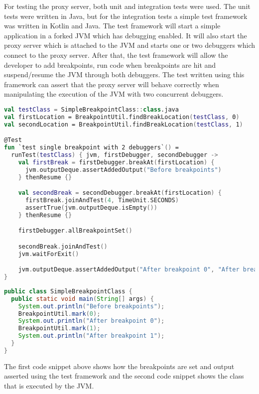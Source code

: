 \documentclass[..thesis.tex]{subfiles}
\begin{document}
For testing the proxy server, both unit and integration tests were used.
The unit tests were written in Java, but for the integration tests a simple test framework was written in Kotlin and Java.
The test framework will start a simple application in a forked JVM which has debugging enabled.
It will also start the proxy server which is attached to the JVM and starts one or two debuggers which connect to the proxy server.
After that, the test framework will allow the developer to add breakpoints, run code when breakpoints are hit and suspend/resume the JVM through both debuggers.
The test written using this framework can assert that the proxy server will behave correctly when manipulating the execution of the JVM with two concurrent debuggers.

\begin{lstlisting}[language=Kotlin]
val testClass = SimpleBreakpointClass::class.java
val firstLocation = BreakpointUtil.findBreakLocation(testClass, 0)
val secondLocation = BreakpointUtil.findBreakLocation(testClass, 1)

@Test
fun `test single breakpoint with 2 debuggers`() = 
  runTest(testClass) { jvm, firstDebugger, secondDebugger ->
    val firstBreak = firstDebugger.breakAt(firstLocation) {
      jvm.outputDeque.assertAddedOutput("Before breakpoints")
    } thenResume {}

    val secondBreak = secondDebugger.breakAt(firstLocation) {
      firstBreak.joinAndTest(4, TimeUnit.SECONDS)
      assertTrue(jvm.outputDeque.isEmpty())
    } thenResume {}

    firstDebugger.allBreakpointSet()

    secondBreak.joinAndTest()
    jvm.waitForExit()

    jvm.outputDeque.assertAddedOutput("After breakpoint 0", "After breakpoint 1")
}
\end{lstlisting}

\begin{lstlisting}[language=Java]
public class SimpleBreakpointClass {
  public static void main(String[] args) {
    System.out.println("Before breakpoints");
    BreakpointUtil.mark(0);
    System.out.println("After breakpoint 0");
    BreakpointUtil.mark(1);
    System.out.println("After breakpoint 1");
  }
}
\end{lstlisting}

The first code snippet above shows how the breakpoints are set and output asserted using the test framework and the second code snippet shows the class that is executed by the JVM.
\end{document}
